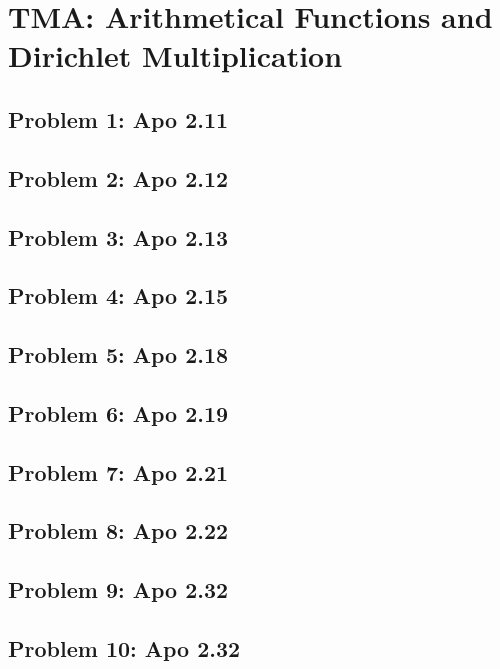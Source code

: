 \section{TMA: Arithmetical Functions and Dirichlet Multiplication}

\subsection[Problem 1]{Problem 1: Apo 2.11}

\subsection[Problem 2]{Problem 2: Apo 2.12}

\subsection[Problem 3]{Problem 3: Apo 2.13}

\subsection[Problem 4]{Problem 4: Apo 2.15}

\subsection[Problem 5]{Problem 5: Apo 2.18}

\subsection[Problem 6]{Problem 6: Apo 2.19}

\subsection[Problem 7]{Problem 7: Apo 2.21}

\subsection[Problem 8]{Problem 8: Apo 2.22}

\subsection[Problem 9]{Problem 9: Apo 2.32}

\subsection[Problem 10]{Problem 10: Apo 2.32}